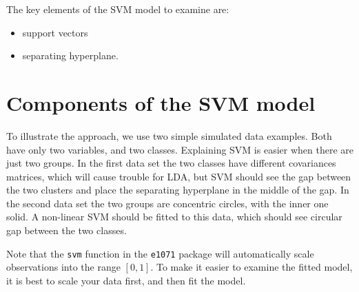 \documentclass[
  letterpaper,
]{book}
\providecommand{\tightlist}{%
  \setlength{\itemsep}{0pt}\setlength{\parskip}{0pt}}\usepackage{longtable,booktabs,array}
\begin{document}
The key elements of the SVM model to examine are:

\begin{itemize}
\tightlist
\item
  support vectors
\item
  separating hyperplane.
\end{itemize}

\hypertarget{components-of-the-svm-model}{%
\section{Components of the SVM
model}\label{components-of-the-svm-model}}

To illustrate the approach, we use two simple simulated data examples.
Both have only two variables, and two classes. Explaining SVM is easier
when there are just two groups. In the first data set the two classes
have different covariances matrices, which will cause trouble for LDA,
but SVM should see the gap between the two clusters and place the
separating hyperplane in the middle of the gap. In the second data set
the two groups are concentric circles, with the inner one solid. A
non-linear SVM should be fitted to this data, which should see circular
gap between the two classes.

Note that the \texttt{svm} function in the \texttt{e1071} package will
automatically scale observations into the range \([0,1]\). To make it
easier to examine the fitted model, it is best to scale your data first,
and then fit the model.
\end{document}
